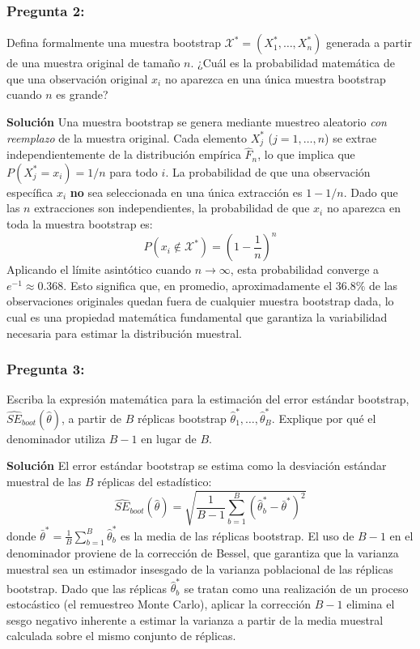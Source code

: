 \documentclass[a4paper]{article}
\begin{document}
\subsubsection{Pregunta 2:} Defina formalmente una muestra bootstrap $\mathcal{X}^* = (X_1^*, \dots, X_n^*)$ generada a partir de una muestra original de tamaño $n$. ¿Cuál es la probabilidad matemática de que una observación original $x_i$ no aparezca en una única muestra bootstrap cuando $n$ es grande?

\textbf{Solución}
Una muestra bootstrap se genera mediante muestreo aleatorio \textit{con reemplazo} de la muestra original. Cada elemento $X_j^*$ ($j=1,\dots,n$) se extrae independientemente de la distribución empírica $\hat{F}_n$, lo que implica que $P(X_j^* = x_i) = 1/n$ para todo $i$. La probabilidad de que una observación específica $x_i$ \textbf{no} sea seleccionada en una única extracción es $1 - 1/n$. Dado que las $n$ extracciones son independientes, la probabilidad de que $x_i$ no aparezca en toda la muestra bootstrap es:
$$ P(x_i \notin \mathcal{X}^*) = \left(1 - \frac{1}{n}\right)^n $$
Aplicando el límite asintótico cuando $n \to \infty$, esta probabilidad converge a $e^{-1} \approx 0.368$. Esto significa que, en promedio, aproximadamente el $36.8\%$ de las observaciones originales quedan fuera de cualquier muestra bootstrap dada, lo cual es una propiedad matemática fundamental que garantiza la variabilidad necesaria para estimar la distribución muestral.

\subsubsection{Pregunta 3:} Escriba la expresión matemática para la estimación del error estándar bootstrap, $\widehat{SE}_{boot}(\hat{\theta})$, a partir de $B$ réplicas bootstrap $\hat{\theta}^*_1, \dots, \hat{\theta}^*_B$. Explique por qué el denominador utiliza $B-1$ en lugar de $B$.

\textbf{Solución}
El error estándar bootstrap se estima como la desviación estándar muestral de las $B$ réplicas del estadístico:
$$ \widehat{SE}_{boot}(\hat{\theta}) = \sqrt{\frac{1}{B-1} \sum_{b=1}^B (\hat{\theta}^*_b - \bar{\theta}^*)^2} $$
donde $\bar{\theta}^* = \frac{1}{B} \sum_{b=1}^B \hat{\theta}^*_b$ es la media de las réplicas bootstrap. El uso de $B-1$ en el denominador proviene de la corrección de Bessel, que garantiza que la varianza muestral sea un estimador insesgado de la varianza poblacional de las réplicas bootstrap. Dado que las réplicas $\hat{\theta}^*_b$ se tratan como una realización de un proceso estocástico (el remuestreo Monte Carlo), aplicar la corrección $B-1$ elimina el sesgo negativo inherente a estimar la varianza a partir de la media muestral calculada sobre el mismo conjunto de réplicas.
\end{document}
